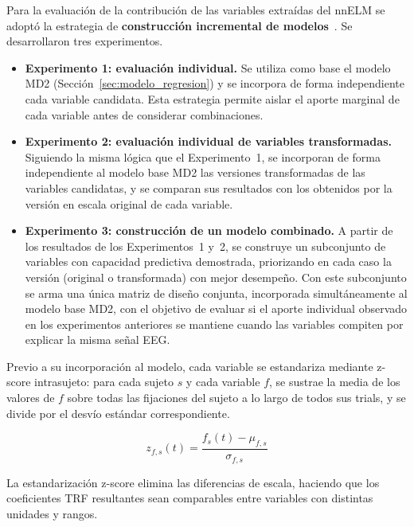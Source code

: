 Para la evaluación de la contribución de las variables extraídas del nnELM se adoptó la estrategia de \textbf{construcción incremental de modelos}~\citep{care2025}. Se desarrollaron tres experimentos.

\begin{itemize}
    \item \textbf{Experimento 1: evaluación individual.} Se utiliza como base el modelo MD2 (Sección~\ref{sec:modelo_regresion}) y se incorpora de forma independiente cada variable candidata. Esta estrategia permite aislar el aporte marginal de cada variable antes de considerar combinaciones.
    \item \textbf{Experimento 2: evaluación individual de variables transformadas.} Siguiendo la misma lógica que el Experimento~1, se incorporan de forma independiente al modelo base MD2 las versiones transformadas de las variables candidatas, y se comparan sus resultados con los obtenidos por la versión en escala original de cada variable.
    \item \textbf{Experimento 3: construcción de un modelo combinado.} A partir de los resultados de los Experimentos~1 y~2, se construye un subconjunto de variables con capacidad predictiva demostrada, priorizando en cada caso la versión (original o transformada) con mejor desempeño. Con este subconjunto se arma una única matriz de diseño conjunta, incorporada simultáneamente al modelo base MD2, con el objetivo de evaluar si el aporte individual observado en los experimentos anteriores se mantiene cuando las variables compiten por explicar la misma señal EEG. 
\end{itemize}

Previo a su incorporación al modelo, cada variable se estandariza mediante z-score intrasujeto: para cada sujeto $s$ y cada variable $f$, se sustrae la media de los valores de $f$ sobre todas las fijaciones del sujeto a lo largo de todos sus trials, y se divide por el desvío estándar correspondiente.

\begin{equation}
    \label{eq:zscore}
    z_{f,s}(t) = \frac{f_s(t) - \mu_{f,s}}{\sigma_{f,s}}
\end{equation}

La estandarización z-score elimina las diferencias de escala, haciendo que los coeficientes TRF resultantes sean comparables entre variables con distintas unidades y rangos.
